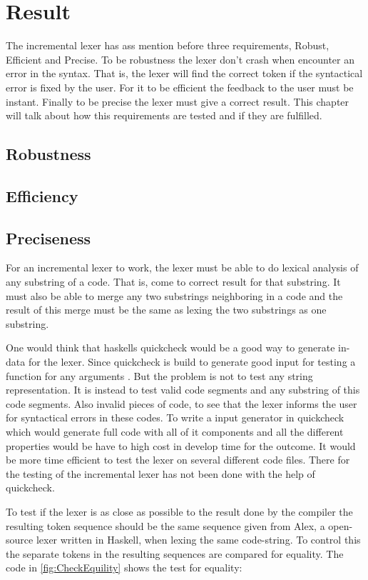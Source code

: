 \chapter{Result}
The incremental lexer has ass mention before three requirements, Robust, Efficient and Precise. To be robustness the lexer don't crash when encounter an error in the syntax. That is, the lexer will find the correct token if the syntactical error is fixed by the user. For it to be efficient the feedback to the user must be instant.
Finally to be precise the lexer must give a correct result. This chapter will talk about how this requirements are tested and if they are fulfilled. 

\section{Robustness}

\section{Efficiency}

\section{Preciseness}
For an incremental lexer to work, the lexer must be able to do lexical analysis of any substring of a code. That is, come to correct result for that substring. It must also be able to merge any two substrings neighboring in a code and the result of this merge must be the same as lexing the two substrings as one substring.

One would think that haskells quickcheck would be a good way to generate in-data for the lexer. Since quickcheck is build to generate good input for testing a function for any arguments \cite{QuickCheck}. But the problem is not to test any string representation. It is instead to test valid code segments and any substring of this code segments. Also invalid pieces of code, to see that the lexer informs the user for syntactical errors in these codes. To write a input generator in quickcheck which would generate full code with all of it components and all the different properties would be have to high cost in develop time for the outcome. It would be more time efficient to test the lexer on several different code files. There for the testing of the incremental lexer has not been done with the help of quickcheck.

To test if the lexer is as close as possible to the result done by the compiler the resulting token sequence should be the same sequence given from Alex, a open-source lexer written in Haskell, when lexing the same code-string.
To control this the separate tokens in the resulting sequences are compared for equality. 
The code in \cref{fig:CheckEquility} shows the test for equality:

